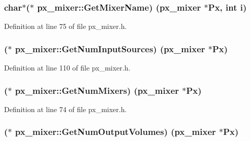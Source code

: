 \subsubsection[{\texorpdfstring{Get\+Mixer\+Name}{GetMixerName}}]{ char$\ast$($\ast$ px\+\_\+mixer\+::\+Get\+Mixer\+Name) ({\bf px\+\_\+mixer} $\ast$Px, {\bf int} {\bf i})}\hypertarget{structpx__mixer_a8028b247e6c2cb8ddc35a0523bf777f7}{}\label{structpx__mixer_a8028b247e6c2cb8ddc35a0523bf777f7}


Definition at line 75 of file px\+\_\+mixer.\+h.

\subsubsection[{\texorpdfstring{Get\+Num\+Input\+Sources}{GetNumInputSources}}]{($\ast$ px\+\_\+mixer\+::\+Get\+Num\+Input\+Sources) ({\bf px\+\_\+mixer} $\ast$Px)}\hypertarget{structpx__mixer_ab1f16463c72c741b58312db36a7af2e1}{}\label{structpx__mixer_ab1f16463c72c741b58312db36a7af2e1}


Definition at line 110 of file px\+\_\+mixer.\+h.

\subsubsection[{\texorpdfstring{Get\+Num\+Mixers}{GetNumMixers}}]{($\ast$ px\+\_\+mixer\+::\+Get\+Num\+Mixers) ({\bf px\+\_\+mixer} $\ast$Px)}\hypertarget{structpx__mixer_add0b06f3a6310d98302608ac01f9244d}{}\label{structpx__mixer_add0b06f3a6310d98302608ac01f9244d}


Definition at line 74 of file px\+\_\+mixer.\+h.

\subsubsection[{\texorpdfstring{Get\+Num\+Output\+Volumes}{GetNumOutputVolumes}}]{($\ast$ px\+\_\+mixer\+::\+Get\+Num\+Output\+Volumes) ({\bf px\+\_\+mixer} $\ast$Px)}\hypertarget{structpx__mixer_a1e76e3359c544174a79099897ed1b7e1}{}\label{structpx__mixer_a1e76e3359c544174a79099897ed1b7e1}


